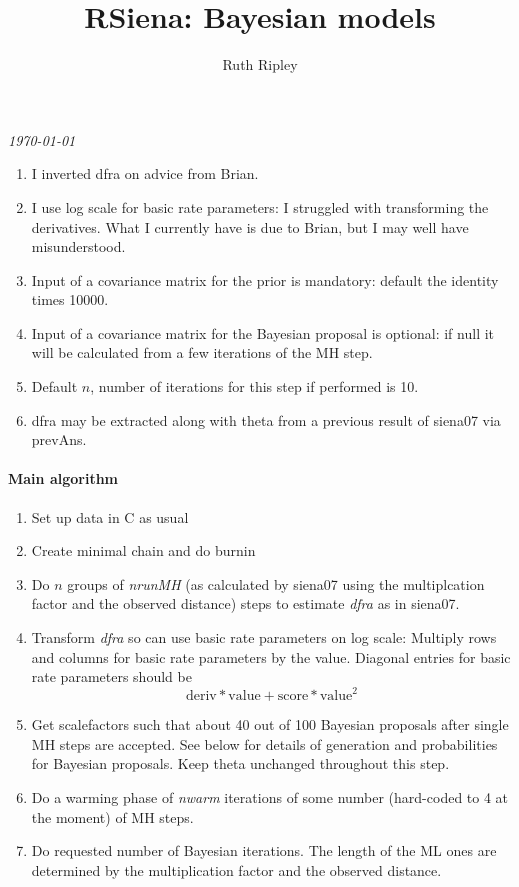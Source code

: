 \documentclass[12pt,a4paper]{article}
\renewcommand{\=}{\,=\,}
\newcommand{\+}{\,+\,}
\newcommand{\nnm}[1]{\textsf{\small\textit{#1}}}
\begin{document}
\title{RSiena: Bayesian models}
\author{Ruth Ripley}
\date{}
\maketitle

\centerline{\emph{\today}}
\bigskip
\begin{enumerate}
\item I inverted dfra on advice from Brian.
\item I use log scale for basic rate parameters: I struggled with transforming
  the derivatives. What I currently have is due to Brian, but I may well have
  misunderstood.
\item Input of a covariance matrix for the prior is mandatory: default the
  identity times 10000.
\item Input of a covariance matrix for the Bayesian proposal is optional: if
  null it will be calculated from a few iterations of the MH step.
\item Default $n$, number of iterations for this step if performed is 10.
\item dfra may be extracted along with theta from a previous result of siena07
via prevAns.
\end{enumerate}
\paragraph{Main algorithm}
\begin{enumerate}
  \item Set up data in C as usual
  \item Create minimal chain and do burnin
  \item Do $n$ groups of \nnm{nrunMH} (as calculated by siena07 using the
    multiplcation factor and the observed distance) steps to
  estimate \nnm{dfra} as in siena07.
  \item Transform \nnm{dfra} so can use basic rate parameters on log scale:
Multiply rows and columns for basic rate parameters by the value. Diagonal
entries for basic rate parameters should be
$$ \textrm{deriv} * \textrm{value} + \textrm{score} * \textrm{value}^2 $$
  \item Get scalefactors such that about 40 out of 100 Bayesian proposals after
  single MH steps are accepted. See below for details of generation and
  probabilities for Bayesian proposals. Keep theta unchanged throughout this
  step.
\item Do a warming phase of \nnm{nwarm} iterations of some number (hard-coded to
  4 at the moment) of MH steps.
\item Do requested number of Bayesian iterations. The
  length of the ML ones are determined by the multiplication factor and the
  observed distance.
\end{enumerate}
\end{document}
